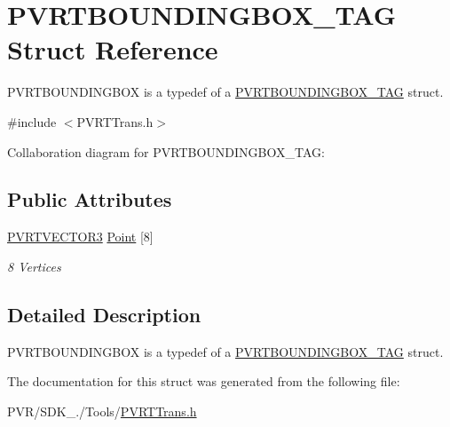 \hypertarget{struct_p_v_r_t_b_o_u_n_d_i_n_g_b_o_x___t_a_g}{\section{P\+V\+R\+T\+B\+O\+U\+N\+D\+I\+N\+G\+B\+O\+X\+\_\+\+T\+A\+G Struct Reference}
\label{struct_p_v_r_t_b_o_u_n_d_i_n_g_b_o_x___t_a_g}
}


P\+V\+R\+T\+B\+O\+U\+N\+D\+I\+N\+G\+B\+O\+X is a typedef of a \hyperlink{struct_p_v_r_t_b_o_u_n_d_i_n_g_b_o_x___t_a_g}{P\+V\+R\+T\+B\+O\+U\+N\+D\+I\+N\+G\+B\+O\+X\+\_\+\+T\+A\+G} struct.  




{\ttfamily \#include $<$P\+V\+R\+T\+Trans.\+h$>$}



Collaboration diagram for P\+V\+R\+T\+B\+O\+U\+N\+D\+I\+N\+G\+B\+O\+X\+\_\+\+T\+A\+G\+:
\subsection*{Public Attributes}
\begin{DoxyCompactItemize}
\item 
\hypertarget{struct_p_v_r_t_b_o_u_n_d_i_n_g_b_o_x___t_a_g_aa124849781753c354de7dbb5069e8202}{\hyperlink{struct_p_v_r_t_v_e_c_t_o_r3f}{P\+V\+R\+T\+V\+E\+C\+T\+O\+R3} \hyperlink{struct_p_v_r_t_b_o_u_n_d_i_n_g_b_o_x___t_a_g_aa124849781753c354de7dbb5069e8202}{Point} \mbox{[}8\mbox{]}}\label{struct_p_v_r_t_b_o_u_n_d_i_n_g_b_o_x___t_a_g_aa124849781753c354de7dbb5069e8202}

\begin{DoxyCompactList}\small\item\em 8 Vertices \end{DoxyCompactList}\end{DoxyCompactItemize}


\subsection{Detailed Description}
P\+V\+R\+T\+B\+O\+U\+N\+D\+I\+N\+G\+B\+O\+X is a typedef of a \hyperlink{struct_p_v_r_t_b_o_u_n_d_i_n_g_b_o_x___t_a_g}{P\+V\+R\+T\+B\+O\+U\+N\+D\+I\+N\+G\+B\+O\+X\+\_\+\+T\+A\+G} struct. 



 

The documentation for this struct was generated from the following file\+:\begin{DoxyCompactItemize}
\item 
P\+V\+R/\+S\+D\+K\+\_./\+Tools/\hyperlink{_p_v_r_t_trans_8h}{P\+V\+R\+T\+Trans.\+h}\end{DoxyCompactItemize}
